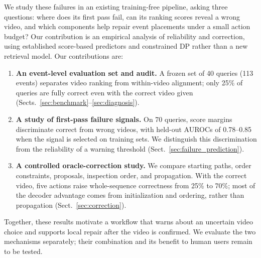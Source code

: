 We study these failures in an existing training-free pipeline, asking three questions: where does its first pass fail, can its ranking scores reveal a wrong video, and which components help repair event placements under a small action budget?
Our contribution is an empirical analysis of reliability and correction, using established score-based predictors and constrained DP rather than a new retrieval model.
Our contributions are:
\begin{enumerate}
\item \textbf{An event-level evaluation set and audit.} A frozen set of 40 queries (113 events) separates video ranking from within-video alignment; only 25\% of queries are fully correct even with the correct video given (Sects.~\ref{sec:benchmark}--\ref{sec:diagnosis}).
\item \textbf{A study of first-pass failure signals.} On 70 queries, score margins discriminate correct from wrong videos, with held-out AUROCs of 0.78--0.85 when the signal is selected on training sets. We distinguish this discrimination from the reliability of a warning threshold (Sect.~\ref{sec:failure_prediction}).
\item \textbf{A controlled oracle-correction study.} We compare starting paths, order constraints, proposals, inspection order, and propagation. With the correct video, five actions raise whole-sequence correctness from 25\% to 70\%; most of the decoder advantage comes from initialization and ordering, rather than propagation (Sect.~\ref{sec:correction}).
\end{enumerate}

Together, these results motivate a workflow that warns about an uncertain video choice and supports local repair after the video is confirmed.
We evaluate the two mechanisms separately; their combination and its benefit to human users remain to be tested.
